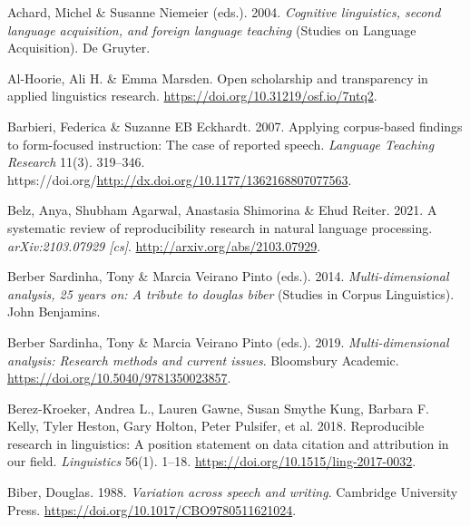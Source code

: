\documentclass[
  letterpaper,
  DIV=11,
  numbers=noendperiod]{scrreprt}
\newlength{\cslhangindent}
\newenvironment{CSLReferences}[2] %
 {\begin{list}{}{%
  \setlength{\itemindent}{0pt}
  \setlength{\leftmargin}{0pt}
  \setlength{\parsep}{0pt}
  \ifodd #1
   \setlength{\leftmargin}{\cslhangindent}
   \setlength{\itemindent}{-1\cslhangindent}
  \fi
  \setlength{\itemsep}{#2\baselineskip}}}
 {\end{list}}
\begin{document}

\label{refs}
\begin{CSLReferences}{1}{0}
Achard, Michel \& Susanne Niemeier (eds.). 2004. \emph{Cognitive
linguistics, second language acquisition, and foreign language teaching}
(Studies on Language Acquisition). De Gruyter.

Al-Hoorie, Ali H. \& Emma Marsden. Open scholarship and transparency in
applied linguistics research.
\url{https://doi.org/10.31219/osf.io/7ntq2}.

Barbieri, Federica \& Suzanne EB Eckhardt. 2007. Applying corpus-based
findings to form-focused instruction: The case of reported speech.
\emph{Language Teaching Research} 11(3). 319--346.
https://doi.org/\url{http://dx.doi.org/10.1177/1362168807077563}.

Belz, Anya, Shubham Agarwal, Anastasia Shimorina \& Ehud Reiter. 2021. A
systematic review of reproducibility research in natural language
processing. \emph{arXiv:2103.07929 {[}cs{]}}.
\url{http://arxiv.org/abs/2103.07929}.

Berber Sardinha, Tony \& Marcia Veirano Pinto (eds.). 2014.
\emph{Multi-dimensional analysis, 25 years on: A tribute to douglas
biber} (Studies in Corpus Linguistics). John Benjamins.

Berber Sardinha, Tony \& Marcia Veirano Pinto (eds.). 2019.
\emph{Multi-dimensional analysis: Research methods and current issues}.
Bloomsbury Academic. \url{https://doi.org/10.5040/9781350023857}.

Berez-Kroeker, Andrea L., Lauren Gawne, Susan Smythe Kung, Barbara F.
Kelly, Tyler Heston, Gary Holton, Peter Pulsifer, et al. 2018.
Reproducible research in linguistics: A position statement on data
citation and attribution in our field. \emph{Linguistics} 56(1). 1--18.
\url{https://doi.org/10.1515/ling-2017-0032}.

Biber, Douglas. 1988. \emph{Variation across speech and writing}.
Cambridge University Press.
\url{https://doi.org/10.1017/CBO9780511621024}.


\end{CSLReferences}
\end{document}
